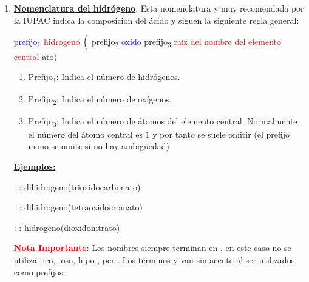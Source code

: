 \documentclass[12pt]{article}
\begin{document}
\begin{enumerate}[label=\numberballgreen]
\begin{enumerate}[label=\numberballgreen]
              \item Si el estado de oxidación es un número menor al tomado como referencia, se le asigna el sufijo .
              \item Si el estado de oxidación son dos  números menor al tomado como referencia, se le asigna el prefijo  + el sufijo .
              \item Si el estado de oxidación es un número por encima del estado de oxidación tomado como referencia se le asigna el prefijo  y el sufijo 
          \end{enumerate}

          \textbf{\uline{Ejemplos}}:

          : : ácido sulfúrico

          : : ácido nitroso

    \item \textbf{\uline{Nomenclatura del hidrógeno}}: Esta nomenclatura y muy recomendada por la IUPAC indica la composición del ácido y siguen la siguiente regla general:
          \begin{center}
              \textcolor{blue}{prefijo\textsubscript{1}} \textcolor{red}{hidrogeno} $\Bigl($ \textcolor{mygreen}{prefijo\textsubscript{2}} \textcolor{blue}{oxido} \textcolor{myBlue}{prefijo\textsubscript{3}} \textcolor{red}{raíz del nombre del elemento central} \textcolor{mygreen}{ato}$\Bigr)$
          \end{center}
          \begin{enumerate}[label=\textcolor{red}{$\bullet$}]
              \item Prefijo\textsubscript{1}: Indica el número de hidrógenos.
              \item Prefijo\textsubscript{2}: Indica el número de oxígenos.
              \item Prefijo\textsubscript{3}: Indica el número de átomos del elemento central. Normalmente el número del átomo central es $1$ y por tanto se suele omitir (el prefijo mono se omite si no hay ambigüedad)
          \end{enumerate}
          \textbf{\uline{Ejemplos:}}

           : : dihidrogeno(trioxidocarbonato)

           : : dihidrogeno(tetraoxidocromato)

           : : hidrogeno(dioxidonitrato)

          \textbf{\textcolor{red}{\uline{Nota Importante}}}: Los nombres siempre terminan en , en este caso no se utiliza -ico, -oso, hipo-, per-. Los términos  y  van sin acento al ser utilizados como prefijos.
\end{enumerate}
\end{document}
